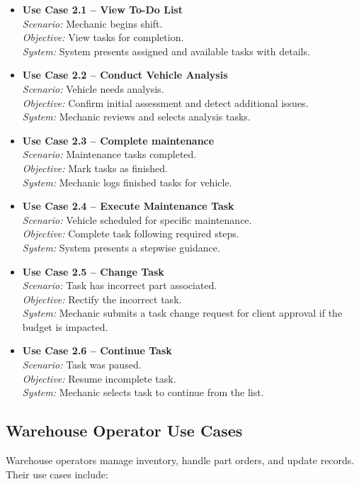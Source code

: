 \begin{itemize}
    \item \textbf{Use Case 2.1 – View To-Do List}\\
    \textit{Scenario:} Mechanic begins shift.\\
    \textit{Objective:} View tasks for completion.\\
    \textit{System:} System presents assigned and available tasks with details.
    \item \textbf{Use Case 2.2 – Conduct Vehicle Analysis}\\
    \textit{Scenario:} Vehicle needs analysis.\\
    \textit{Objective:} Confirm initial assessment and detect additional issues.\\
    \textit{System:} Mechanic reviews and selects analysis tasks.
    \item \textbf{Use Case 2.3 – Complete maintenance}\\
    \textit{Scenario:} Maintenance tasks completed.\\
    \textit{Objective:} Mark tasks as finished.\\
    \textit{System:} Mechanic logs finished tasks for vehicle.
    \item \textbf{Use Case 2.4 – Execute Maintenance Task}\\
    \textit{Scenario:} Vehicle scheduled for specific maintenance.\\
    \textit{Objective:} Complete task following required steps.\\
    \textit{System:} System presents a stepwise guidance.
    \item \textbf{Use Case 2.5 – Change Task}\\
    \textit{Scenario:} Task has incorrect part associated.\\
    \textit{Objective:} Rectify the incorrect task.\\
    \textit{System:} Mechanic submits a task change request for client approval if the budget is impacted.
    \item \textbf{Use Case 2.6 – Continue Task}\\
    \textit{Scenario:} Task was paused.\\
    \textit{Objective:} Resume incomplete task.\\
    \textit{System:} Mechanic selects task to continue from the list.
\end{itemize}

\subsection{Warehouse Operator Use Cases}
Warehouse operators manage inventory, handle part orders, and update records. Their use cases include:

